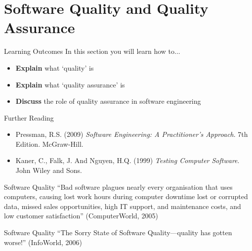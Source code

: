 \part{Software Quality and Quality Assurance}
\frame{\partpage}

\begin{frame}{Learning Outcomes}
	In this section you will learn how to...
	
	\begin{itemize}
		\item \textbf{Explain} what `quality' is
		\item \textbf{Explain} what `quality assurance' is
		\item \textbf{Discuss} the role of quality assurance in software engineering
	\end{itemize}
\end{frame}

\begin{frame}{Further Reading}
	\begin{itemize}
		\item Pressman, R.S. (2009) \textit{Software Engineering: A Practitioner's Approach}. 7th Edition. McGraw-Hill.
		\item Kaner, C., Falk, J. And Nguyen, H.Q. (1999) \textit{Testing Computer Software}. John Wiley and Sons.
	\end{itemize}
\end{frame}

\begin{frame}[fragile]{Software Quality}
    ``Bad software plagues nearly every organisation that uses computers, causing lost work hours during computer downtime
    lost or corrupted data, missed sales opportunities, high IT support, and maintenance costs, and low customer satisfaction''
    \vspace{2ex}
    (ComputerWorld, 2005)
\end{frame}

\begin{frame}[fragile]{Software Quality}
    ``The Sorry State of Software Quality---quality has gotten worse!''
    \vspace{2ex}
    (InfoWorld, 2006)
\end{frame}

